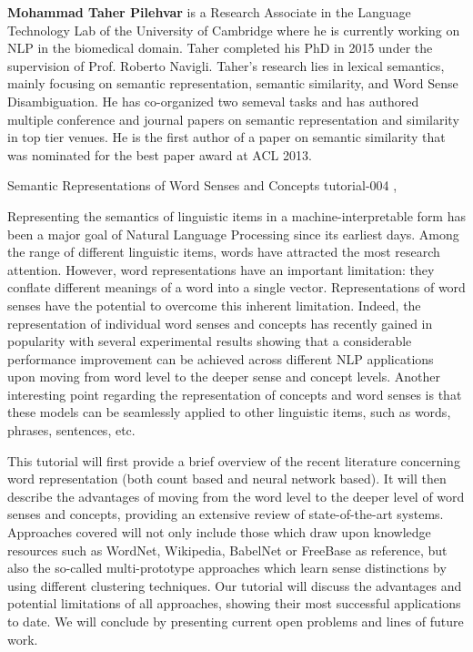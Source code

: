 \begin{bio}
{\bfseries Mohammad Taher Pilehvar} is a Research Associate in the Language Technology Lab of the University of Cambridge where he is currently working on NLP in the biomedical domain. Taher completed his PhD in 2015 under the supervision of Prof. Roberto Navigli. Taher's research lies in lexical semantics, mainly focusing on semantic representation, semantic similarity, and Word Sense Disambiguation. He has co-organized two semeval tasks and has authored multiple conference and journal papers on semantic representation and similarity in top tier venues. He is the first author of a paper on semantic similarity that was nominated for the best paper award at ACL 2013.
\end{bio}

\begin{tutorial}
  {Semantic Representations of Word Senses and Concepts}
  {tutorial-004}
  {\daydateyear, \tutorialmorningtime}
  {\TutLocD}

Representing the semantics of linguistic items in a machine-interpretable form has been a major goal of Natural Language Processing since its earliest days. Among the range of different linguistic items, words have attracted the most research attention. However, word representations have an important limitation: they conflate different meanings of a word into a single vector. Representations of word senses have the potential to overcome this inherent limitation. Indeed, the representation of individual word senses and concepts has recently gained in popularity with several experimental results showing that a considerable performance improvement can be achieved across different NLP applications upon moving from word level to the deeper sense and concept levels. Another interesting point regarding the representation of concepts and word senses is that these models can be seamlessly applied to other linguistic items, such as words, phrases, sentences, etc.

This tutorial will first provide a brief overview of the recent literature concerning word representation (both count based and neural network based). It will then describe the advantages of moving from the word level to the deeper level of word senses and concepts, providing an extensive review of state-of-the-art systems. Approaches covered will not only include those which draw upon knowledge resources such as WordNet, Wikipedia, BabelNet or FreeBase as reference, but also the so-called multi-prototype approaches which learn sense distinctions by using different clustering techniques. Our tutorial will discuss the advantages and potential limitations of all approaches, showing their most successful applications to date. We will conclude by presenting current open problems and lines of future work.
\end{tutorial}
